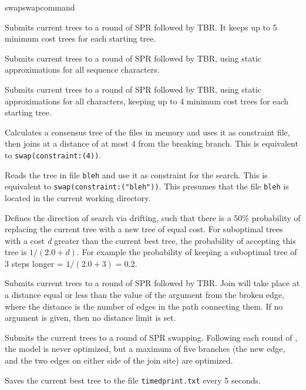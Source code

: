 \begin{command}{swap}{swapcommand}
\begin{poyexamples}
{Submits current trees to a round of SPR followed by TBR. It keeps
up to 5 minimum cost trees for each starting tree.}

{Submits current trees to a round of SPR followed by TBR, using
static approximations for all sequence characters.}

{Submits current trees to a round of SPR followed by TBR, using
static approximations for all characters, keeping up to 4 minimum
cost trees for each starting tree.}

{Calculates a consensus tree of the files in memory and uses it as
constraint file, then joins at a distance of at most 4 from the breaking
branch. This is equivalent to \texttt{swap(constraint:(4))}.}

{Reads the tree in file \texttt{bleh} and use it as constraint for the
search. This is equivalent to \texttt{swap(constraint:("bleh"))}. This 
presumes that the file \texttt{bleh} is located in the current working directory.}	

{Defines the direction of search via drifting, such that there is a 50\% probability of 
replacing the current tree with a new tree of equal cost. For suboptimal trees with 
a cost \emph{d} greater than the current best tree, the probability of accepting this tree 
is $1 / (2.0 + d)$. For example the
probability of keeping a suboptimal tree of 3 steps longer = $1 / (2.0 + 3) = 0.2$.}

{Submits current trees to a round of SPR followed by TBR. Join will take place
at a distance equal or less than the value of the argument from the broken edge, 
where the distance is the number of edges in the path connecting them. If no 
argument is given, then no distance limit is set.}

{Submits the current trees to a round of SPR swapping. Following each round of 
, the model is never optimized, but a maximum of five branches 
(the new edge, and the two edges on either side of the join site) are optimized.}

{Saves the current best tree to the file \texttt{timedprint.txt} every 5 seconds.}

\end{poyexamples}

\begin{poyalso}
\end{poyalso} 

\end{command}

